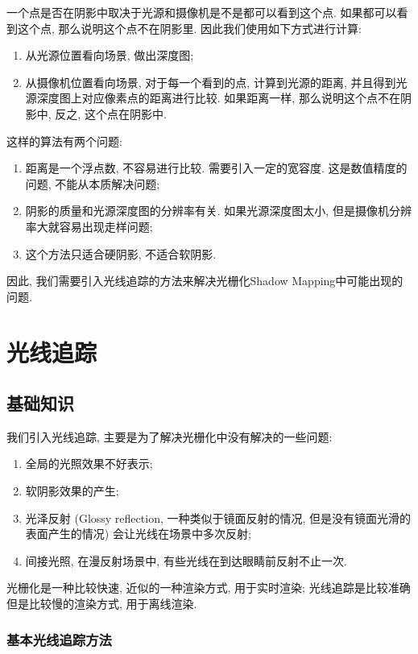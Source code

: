 \documentclass[openany]{progbookcn}
\begin{document}
一个点是否在阴影中取决于光源和摄像机是不是都可以看到这个点. 如果都可以看到这个点, 那么说明这个点不在阴影里. 因此我们使用如下方式进行计算: 
\begin{enumerate}
	\item 从光源位置看向场景, 做出深度图; 
	\item 从摄像机位置看向场景, 对于每一个看到的点, 计算到光源的距离, 并且得到光源深度图上对应像素点的距离进行比较. 如果距离一样, 那么说明这个点不在阴影中, 反之, 这个点在阴影中. 
\end{enumerate}

这样的算法有两个问题: 
\begin{enumerate}
	\item 距离是一个浮点数, 不容易进行比较. 需要引入一定的宽容度. 这是数值精度的问题, 不能从本质解决问题; 
	\item 阴影的质量和光源深度图的分辨率有关. 如果光源深度图太小, 但是摄像机分辨率大就容易出现走样问题; 
	\item 这个方法只适合硬阴影, 不适合软阴影. 
\end{enumerate}

因此, 我们需要引入光线追踪的方法来解决光栅化Shadow Mapping中可能出现的问题. 

\chapter{光线追踪}

\section{基础知识}

我们引入光线追踪, 主要是为了解决光栅化中没有解决的一些问题: 
\begin{enumerate}
	\item 全局的光照效果不好表示; 
	\item 软阴影效果的产生; 
	\item 光泽反射 (Glossy reflection, 一种类似于镜面反射的情况, 但是没有镜面光滑的表面产生的情况) 会让光线在场景中多次反射; 
	\item 间接光照, 在漫反射场景中, 有些光线在到达眼睛前反射不止一次. 
\end{enumerate}

光栅化是一种比较快速, 近似的一种渲染方式, 用于实时渲染; 光线追踪是比较准确但是比较慢的渲染方式, 用于离线渲染. 

\subsection{基本光线追踪方法}
\end{document}
